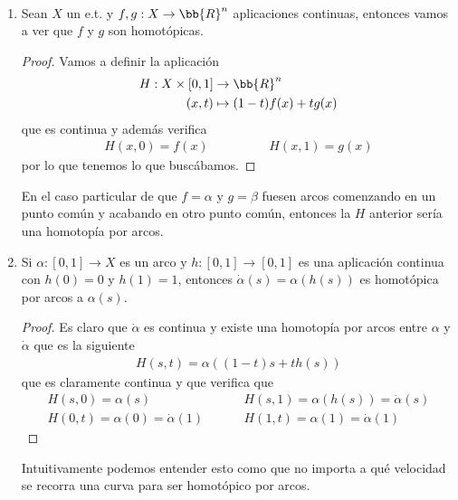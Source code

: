 
\begin{ejemplo}\
    \begin{enumerate}
        \item Sean $X$ un e.t. y $f,g:X \to \bb{R}^n$ aplicaciones continuas, entonces vamos a ver que $f$ y $g$ son homotópicas.
        \begin{proof}
            Vamos a definir la aplicación
            \begin{align*}
                H:X\times [0,1]&\to \bb{R}^n\\
                (x,t) & \mapsto (1-t)f(x) + tg(x)
            \end{align*} 
            que es continua y además verifica
            \begin{gather*}
                H(x,0) = f(x) \hspace{2cm} H(x,1) = g(x)
            \end{gather*}
            por lo que tenemos lo que buscábamos.
        \end{proof}
        En el caso particular de que $f=\alpha$ y $g=\beta$ fuesen arcos comenzando en un punto común y acabando en otro punto común, entonces la $H$ anterior sería una homotopía por arcos.

        \item Si $\alpha: [0,1]\to X$ es un arco y $h:[0,1] \to [0,1]$ es una aplicación continua con $h(0)=0$ y $h(1)=1$, entonces $\dot{\alpha}(s) = \alpha(h(s))$ es homotópica por arcos a $\alpha(s)$.
        
        \begin{proof}
            Es claro que $\dot{\alpha}$ es continua y existe una homotopía por arcos entre $\alpha$ y $\dot{\alpha}$ que es la siguiente
            \begin{gather*}
                H(s,t) = \alpha((1-t)s + th(s))
            \end{gather*}
            que es claramente continua y que verifica que 
            \begin{align*}
                H(s,0) = \alpha(s) \hspace{1cm} & H(s,1) = \alpha(h(s)) = \dot{\alpha}(s)\\
                H(0,t) = \alpha(0)=\dot{\alpha}(1) \hspace{1cm} & H(1,t) = \alpha(1) = \dot{\alpha}(1)
            \end{align*}
        \end{proof}
        Intuitivamente podemos entender esto como que no importa a qué velocidad se recorra una curva para ser homotópico por arcos.
    \end{enumerate} 
\end{ejemplo}


